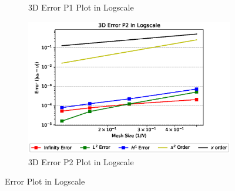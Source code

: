 \documentclass[a4paper,11pt]{article}
\begin{document}
\begin{figure}[h!]
\begin{subfigure}[b]{0.5\linewidth}
		\caption{3D Error P1 Plot in Logscale}
		\label{fig:3derrorP1crack}
	\end{subfigure}
	\quad
	\begin{subfigure}[b]{0.5\linewidth}
		\centering
		\includegraphics[width=\linewidth]{picture/conference/all3derrorP2}
		\caption{3D Error P2 Plot in Logscale}
		\label{fig:3derrorP2crack}
	\end{subfigure}
\fi
	\caption{Error Plot in Logscale}
	\label{fig:errorplotcrack}
\end{figure}

\newpage
\end{document}
